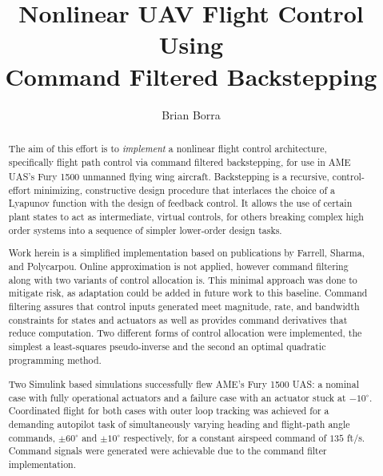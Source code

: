 \documentclass[12pt]{ucthesis}
\title{Nonlinear UAV Flight Control Using \protect\\ Command Filtered Backstepping}
\author{Brian Borra}
\begin{document}
\maketitle

\begin{frontmatter}
	
	\copyrightpage
	\committeemembershippage

	\begin{abstract}
		The aim of this effort is to \textit{implement} a nonlinear flight control architecture, specifically flight path control via command filtered backstepping, for use in AME UAS's Fury\textsuperscript{\textregistered} 1500 unmanned flying wing aircraft. Backstepping is a recursive, control-effort minimizing, constructive design procedure that interlaces the choice of a Lyapunov function with the design of feedback control. It allows the use of certain plant states to act as intermediate, virtual controls, for others breaking complex high order systems into a sequence of simpler lower-order design tasks. 
		
		Work herein is a simplified implementation based on publications by Farrell, Sharma, and Polycarpou.  Online approximation is not applied, however command filtering along with two variants of control allocation is. This minimal approach was done to mitigate risk, as adaptation could be added in future work to this baseline. Command filtering assures that control inputs generated meet magnitude, rate, and bandwidth constraints for states and actuators as well as provides command derivatives that reduce computation. Two different forms of control allocation were implemented, the simplest a least-squares pseudo-inverse and the second an optimal quadratic programming method.	%
		
		Two Simulink based simulations successfully flew AME's Fury\textsuperscript{\textregistered} 1500 UAS: a nominal case with fully operational actuators and a failure case with an actuator stuck at $-10^{\circ}$. Coordinated flight for both cases with outer loop tracking was achieved for a demanding autopilot task of simultaneously varying heading and flight-path angle commands, $\pm 60^{\circ}$ and $\pm 10^{\circ}$ respectively, for a constant airspeed command of $135$ ft/s. Command signals were generated were achievable due to the command filter implementation. 
	\end{abstract}
	

\end{frontmatter}
\end{document}
